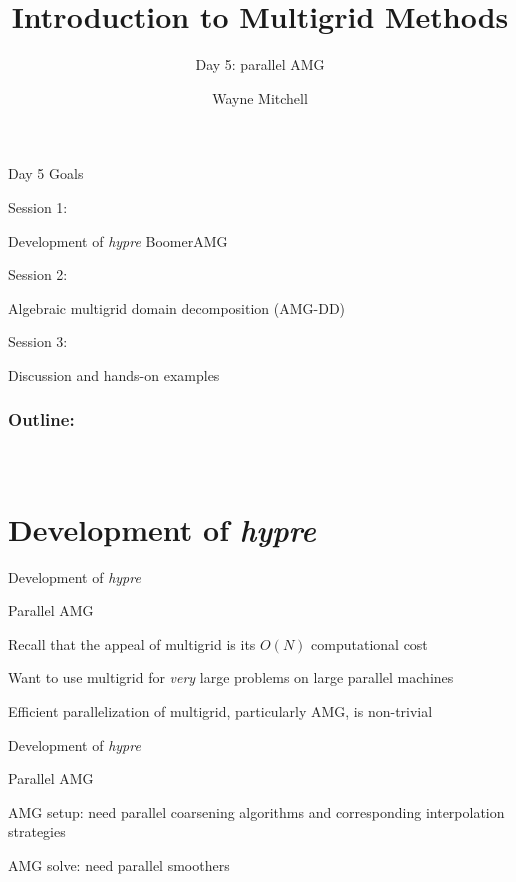 \documentclass[18pt,xcolor=table]{beamer}
\title[Multigrid]{Introduction to Multigrid Methods}
\subtitle{Day 5: parallel AMG}
\author[Mitchell]{Wayne Mitchell}
\institute{\pgfuseimage{logo}\\Universit\"at Heidelberg\\Institut f\"ur Technische Informatik}
\date[]{\alert{}}
\begin{document}


\DeclareRobustCommand{\Chi}{\raisebox{2pt}{$\chi$}}

\begin{frame}{}
\begin{block}{Day 5 Goals}
\bit
\item Session 1:
\bit
\item Development of \emph{hypre} BoomerAMG
\eit
\item Session 2:
\bit
\item Algebraic multigrid domain decomposition (AMG-DD)
\eit
\item Session 3:
\bit
\item Discussion and hands-on examples
\eit
\eit
\end{block}
\end{frame}

\begin{frame}
\frametitle{\bf Outline:}
\framesubtitle{~~}
\tableofcontents
\end{frame}


\section{Development of \emph{hypre}}

\begin{frame}{Development of \emph{hypre}}
\begin{block}{Parallel AMG}
\bit
\item Recall that the appeal of multigrid is its $O(N)$ computational cost
\item Want to use multigrid for \emph{very} large problems on large parallel machines
\item Efficient parallelization of multigrid, particularly AMG, is non-trivial
\eit
\end{block}
\end{frame}

\begin{frame}{Development of \emph{hypre}}
\begin{block}{Parallel AMG}
\bit
\item AMG setup: need parallel coarsening algorithms and corresponding interpolation strategies
\item AMG solve: need parallel smoothers
\eit
\end{block}
\end{frame}
\end{document}
